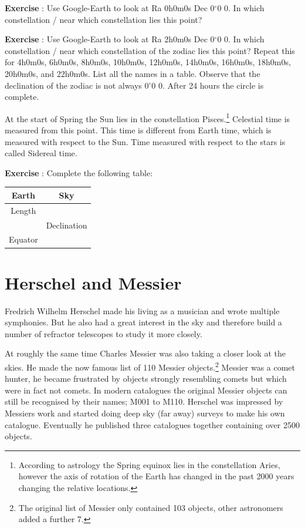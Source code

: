 \documentclass[12pt,a4paper]{article}
\numberwithin{equation}{section}
\numberwithin{figure}{section}
\newcounter{Exercise}
\numberwithin{table}{section}
\begin{document}
\begin{shaded}
\textbf{Exercise \theExercise {}} : Use Google-Earth to look at Ra 0h0m0s Dec 0$^{\circ}$0 0. In which constellation / near which constellation lies this point?\end{shaded}
\begin{shaded}
\textbf{Exercise \theExercise {}} : Use Google-Earth to look at Ra 2h0m0s Dec 0$^{\circ}$0 0. In which constellation / near which constellation of the zodiac lies this point? Repeat this for 4h0m0s, 6h0m0s, 8h0m0s, 10h0m0s, 12h0m0s, 14h0m0s, 16h0m0s, 18h0m0s, 20h0m0s, and 22h0m0s. List all the names in a table. Observe that the declination of the zodiac is not always 0$^{\circ}$0 0. After 24 hours the circle is complete.\end{shaded}

At the start of Spring the Sun lies in the constellation Pisces.\footnote{According to astrology the Spring equinox lies in the constellation Aries, however the axis of rotation of the Earth has changed in the past 2000 years changing the relative locations.} Celestial time is measured from this point. This time is different from Earth time, which is measured with respect to the Sun. Time measured with respect to the stars is called Sidereal time.

\begin{shaded}
\textbf{Exercise \theExercise {}} : Complete the following table:
\begin{tabular}{|c|c|}
\hline
\textbf{Earth} & \textbf{Sky} \\
\hline
Length &   \\
\hline
 & Declination \\
\hline
Equator & \\
\hline
\end{tabular}\end{shaded}

\section{Herschel and Messier}
Fredrich Wilhelm Herschel made his living as a musician and wrote multiple symphonies. But he also had a great interest in the sky and therefore build a number of refractor telescopes to study it more closely.

At roughly the same time Charles Messier was also taking a closer look at the skies. He made the now famous list of 110 Messier objects.\footnote{The original list of Messier only contained 103 objects, other astronomers added a further 7.} Messier was a comet hunter, he became frustrated by objects strongly resembling comets but which were in fact not comets. In modern catalogues the original Messier objects can still be recognised by their names; M001 to M110. Herschel was impressed by Messiers work and started doing deep sky (far away) surveys to make his own catalogue. Eventually he published three catalogues together containing over 2500 objects.
\end{document}
